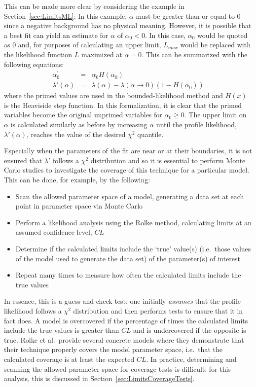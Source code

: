 This can be made more clear by considering the example in Section~\ref{sec:LimitsML}:  In this example, $\alpha$ must be greater than or equal to 0 since a negative background has no physical meaning.  However, it is possible that a best fit can yield an estimate for $\alpha$ of $\alpha_{0}<0$.  In this case, $\alpha_{0}$ would be quoted as 0 and, for purposes of calculating an upper limit, $L_{max}$ would be replaced with the likelihood function $L$ maximized at $\alpha = 0$.  This can be summarized with the following equations:
		\begin{equation}
			\begin{array}{rcl}
				\alpha_0^{\prime} & = & \alpha_0 H (\alpha_0) \\
				\lambda' (\alpha) & = & \lambda(\alpha) - \lambda(\alpha \to 0) (1 - H(\alpha_0))
			\end{array}
		\end{equation}
where the primed values are used in the bounded-likelihood method and $H(x)$ is the Heaviside step function.  In this formalization, it is clear that the primed variables become the original unprimed variables for $\alpha_{0}\geq0$.  The upper limit on $\alpha$ is calculated similarly as before by increasing $\alpha$ until the profile likelihood, $\lambda'(\alpha)$, reaches the value of the desired $\chi^{2}$ quantile. 

 Especially when the parameters of the fit are near or at their boundaries, it is not ensured that $\lambda'$ follows a $\chi^{2}$ distribution and so it is essential to perform Monte Carlo studies to investigate the coverage of this technique for a particular model.  This can be done, for example, by the following:
		\begin{itemize}
			\item Scan the allowed parameter space of a model, 
			generating a data set at each point in parameter space via Monte Carlo
			\item Perform a likelihood analysis using the Rolke method, calculating limits at an 
			assumed confidence level, $CL$
			\item Determine if the calculated limits include the `true' value(s) (i.e.~those values of 
			the model used to generate the data set) of the parameter(s) of interest 
			\item Repeat many times to measure how often the calculated limits include the true values
		\end{itemize}			
In essence, this is a guess-and-check test: one initially \emph{assumes} that the profile likelihood follows a $\chi^{2}$ distribution and then performs tests to ensure that it in fact does.  A model is overcovered if the percentage of times the calculated limits include the true values is greater than $CL$ and is undercovered if the opposite is true.  Rolke et al.~provide several concrete models where they demonstrate that their technique properly covers the model parameter space, i.e.~that the calculated coverage is at least the expected $CL$.  In practice, determining and scanning the allowed parameter space for coverage tests is difficult: for this analysis, this is discussed in Section~\ref{sec:LimitsCoverageTests}.


